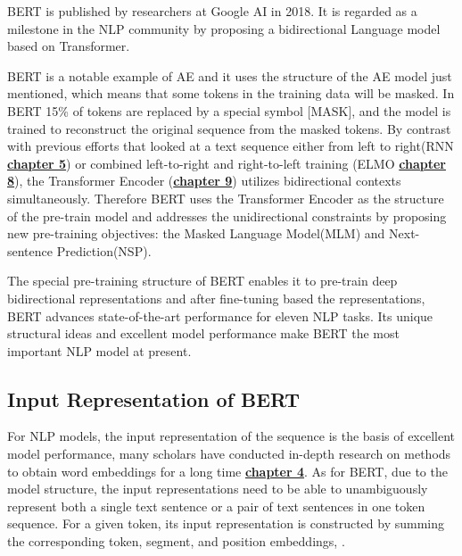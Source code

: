 \documentclass[]{krantz}
\begin{document}
BERT is published by researchers at Google AI in 2018. It is regarded as a milestone in the NLP community by proposing a bidirectional Language model based on Transformer.

BERT is a notable example of AE and it uses the structure of the AE model just mentioned, which means that some tokens in the training data will be masked. In BERT 15\% of tokens are replaced by a special symbol {[}MASK{]}, and the model is trained to reconstruct the original sequence from the masked tokens. By contrast with previous efforts that looked at a text sequence either from left to right(RNN \protect\hyperlink{Recurrentux5cux2520neuralux5cux2520networksux5cux2520andux5cux2520theirux5cux2520applicationsux5cux2520inux5cux2520NLP}{\textbf{chapter 5}}) or combined left-to-right and right-to-left training (ELMO \protect\hyperlink{Transfer-Learning-for-NLP-i}{\textbf{chapter 8}}), the Transformer Encoder (\protect\hyperlink{ux5cux2520Attentionux5cux2520andux5cux2520Self-Attentionux5cux2520forux5cux2520NLP}{\textbf{chapter 9}}) utilizes bidirectional contexts simultaneously. Therefore BERT uses the Transformer Encoder as the structure of the pre-train model and addresses the unidirectional constraints by proposing new pre-training objectives: the Masked Language Model(MLM) and Next-sentence Prediction(NSP).

The special pre-training structure of BERT enables it to pre-train deep bidirectional representations and after fine-tuning based the representations, BERT advances state-of-the-art performance for eleven NLP tasks. Its unique structural ideas and excellent model performance make BERT the most important NLP model at present.

\hypertarget{input-representation-of-bert}{%
\subsection{Input Representation of BERT}\label{input-representation-of-bert}}

For NLP models, the input representation of the sequence is the basis of excellent model performance, many scholars have conducted in-depth research on methods to obtain word embeddings for a long time \protect\hyperlink{Foundationsux2fApplicationsux5cux2520ofux5cux2520Modernux5cux2520NLP}{\textbf{chapter 4}}. As for BERT, due to the model structure, the input representations need to be able to unambiguously represent both a single text sentence or a pair of text sentences in one token sequence. For a given token, its input representation is constructed by summing the corresponding token, segment, and position embeddings, \citet{bert}.
\end{document}
